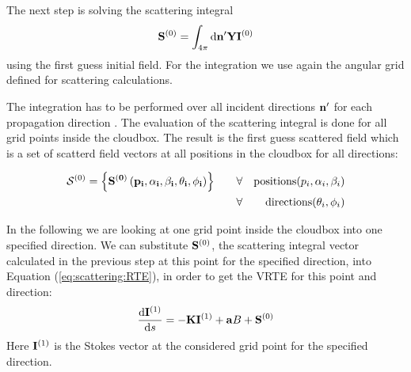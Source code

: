 
  The next step is solving the scattering
  integral
\begin{eqnarray}
  {\bf S}^{(0)} = \int_{4\pi} \mathrm{d} {\bf n}^\prime
  {\bf Y} {\bf I}^{(0)}
\label{eq:scat_int}
\end{eqnarray}
using the first guess initial field. For the integration we use again the angular grid defined for scattering calculations.

The integration has to be performed over all incident directions
${\bf n}^\prime$ for each propagation direction \PDir{}. The evaluation
of the scattering integral is done for all grid points inside the
cloudbox. The result is the first guess scattered field  which is a set of scatterd field vectors at all positions in the cloudbox for all directions:

\begin{eqnarray}
{\mathcal S}^{(0)} = \left\{ \bf{S}^{(0)} \left( p_i, \alpha_i, \beta_i, \theta_i, \phi_i\right)\right\}  \qquad  
&\forall& {\rm positions } (p_i,\alpha_i, \beta_i)\\
&\forall& {\rm directions } (\theta_i,\phi_i)
\end{eqnarray}



  In the following we are looking at one grid point inside the
  cloudbox into one specified direction.  We can substitute
  ${\bf S}^{(0)}$, the scattering integral vector calculated in the
  previous step at this point for the specified direction, into
  Equation (\ref{eq:scattering:RTE}), in order to get the VRTE for
  this point and direction:
\begin{eqnarray}
     \frac{\mathrm{d} {\bf I}^{(1)}}{\mathrm{d} s} =
     -{\bf K} {\bf I}^{(1)} + {\bf a} B
     +{\bf S}^{(0)}
\label{eq:scattering:vrte_fs}
\end{eqnarray} 
Here ${\bf I}^{(1)}$ is the Stokes vector at the considered grid point
for the specified direction.

